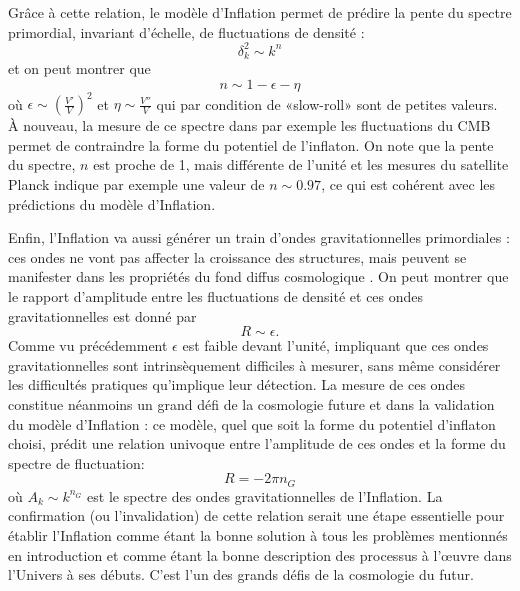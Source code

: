 Grâce à cette relation, le modèle d'Inflation permet de prédire la pente du spectre primordial, invariant d'échelle, de fluctuations de densité :
\begin{equation}
\delta^2_k\sim k^n
\end{equation}
et on peut montrer que 
\begin{equation}
n\sim 1-\epsilon -\eta
\end{equation}
où $\epsilon\sim (\frac{V'}{V})^2$ et $\eta \sim \frac{V''}{V}$ qui par condition de «slow-roll» sont de petites valeurs. À nouveau, la mesure de ce spectre dans par exemple les fluctuations du CMB permet de contraindre la forme du potentiel de l'inflaton. On note que la pente du spectre, $n$ est proche de 1, mais différente de l'unité et les mesures du satellite Planck indique par exemple une valeur de $n\sim 0.97$, ce qui est cohérent avec les prédictions du modèle d'Inflation.

Enfin, l'Inflation va aussi générer un train d'ondes gravitationnelles primordiales : ces ondes ne vont pas affecter la croissance des structures, mais peuvent se manifester dans les propriétés du fond diffus cosmologique .
On peut montrer que le rapport d'amplitude entre les fluctuations de densité et ces ondes gravitationnelles est donné par
\begin{equation}
R\sim \epsilon.
\end{equation}
Comme vu précédemment $\epsilon$ est faible devant l'unité, impliquant que ces ondes gravitationnelles sont intrinsèquement difficiles à mesurer, sans même considérer les difficultés pratiques qu'implique leur détection. La mesure de ces ondes constitue néanmoins un grand défi de la cosmologie future et dans la validation du modèle d'Inflation : ce modèle, quel que soit la forme du potentiel d'inflaton choisi, prédit une relation univoque entre l'amplitude de ces ondes et la forme du spectre de fluctuation:
\begin{equation}
R=-2\pi n_G
\end{equation}
où $A_k\sim k^{n_G}$ est le spectre des ondes gravitationnelles de l'Inflation. La confirmation (ou l'invalidation) de cette relation serait une étape essentielle pour établir l'Inflation comme étant la bonne solution à tous les problèmes mentionnés en introduction et comme étant la bonne description des processus à l'œuvre dans l'Univers à ses débuts. C'est l'un des grands défis de la cosmologie du futur.